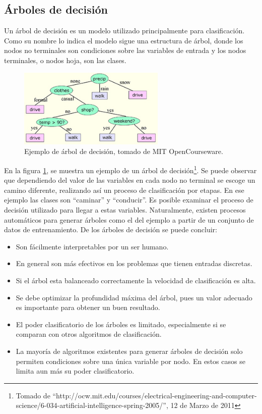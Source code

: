 \documentclass[a4paper, 11pt, oneside]{report}
\begin{document}
\subsection{Árboles de decisión}
Un árbol de decisión es un modelo utilizado principalmente para clasificación. Como su nombre lo indica el modelo sigue una estructura de árbol, donde los nodos no terminales son condiciones sobre las variables de entrada y los nodos terminales, o nodos hoja, son las clases.
\begin{figure}[htb]
\begin{center}
\leavevmode
\includegraphics[width=7cm]{img/decisiontree.jpg}
\end{center}
\caption{Ejemplo de árbol de decisión, tomado de MIT OpenCourseware.}
\label{fig:decisionTree}
\end{figure}
En la figura \ref{fig:decisionTree}, se muestra un ejemplo de un árbol de decisión\footnote{Tomado de ``http://ocw.mit.edu/courses/electrical-engineering-and-computer-science/6-034-artificial-intelligence-spring-2005/'', 12 de Marzo de 2011}. Se puede observar que dependiendo del valor de las variables en cada nodo no terminal se escoge un camino diferente, realizando así un proceso de clasificación por etapas. En ese ejemplo las clases son ``caminar'' y ``conducir''. Es posible examinar el proceso de decisión utilizado para llegar a estas variables. Naturalmente, existen procesos automáticos para generar árboles como el del ejemplo a partir de un conjunto de datos de entrenamiento.
De los árboles de decisión se puede concluir:
\begin{itemize}
\item Son fácilmente interpretables por un ser humano.
\item En general son más efectivos en los problemas que tienen entradas discretas.
\item Si el árbol esta balanceado correctamente la velocidad de clasificación es alta.
\item Se debe optimizar la profundidad máxima del árbol, pues un valor adecuado es importante para obtener un buen resultado.
\item El poder clasificatorio de los árboles es limitado, especialmente si se comparan con otros algoritmos de clasificación.
\item La mayoría de algoritmos existentes para generar árboles de decisión solo permiten condiciones sobre una única variable por nodo. En estos casos se limita aun más su poder clasificatorio. 
\end{itemize}
\end{document}
